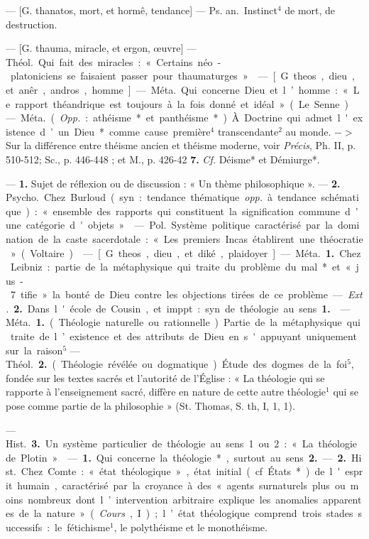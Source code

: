 \begin{itemize}[leftmargin=1cm, label=, itemsep=1pt]
 — [G. thanatos, mort, et
hormê, tendance] — \si{Ps. an.} Instinct$^4$
de mort, de destruction.

 — [G. thauma, miracle, et
ergon, œuvre] — \si{Théol.} Qui fait
des miracles : « Certains néo-platoniciens se faisaient passer pour
thaumaturges. »

 — [G. theos, dieu, et anêr,
andros, homme] — \si{Méta.} Qui concerne Dieu et l’homme : « Le rapport
théandrique est toujours à la fois
donné et idéal » (Le Senne).

 — \si{Méta.} ({\it Opp.} : athéisme* et
panthéisme*). À. Doctrine qui admet
l'existence d’un Dieu* comme cause
première$^4$ transcendante$^2$ au monde.
$->$ Sur la différence entre théisme
ancien et théisme moderne, voir
{\it Précis}, Ph. II, p. 510-512; Sc.,
p. 446-448 ; et M., p. 426-42 {\bf 7.} {\it Cf.}
Déisme* et Démiurge*.

 — {\bf 1.} Sujet de réflexion ou de
discussion : « Un thème philosophique ». — {\bf 2.} \si{Psycho.} Chez Burloud (syn. : tendance thématique {\it opp.}
à tendance schématique) : « ensemble
des rapports qui constituent la signification commune d’une catégorie d'objets. »

 — \si{Pol.} Système politique
caractérisé par la domination de la
caste sacerdotale : « Les premiers
Incas établirent une théocratie »
(Voltaire).

 — [G. theos, dieu, et diké, plaidoyer] — \si{Méta.} {\bf 1.} Chez Leibniz :
partie de la métaphysique qui
traite du problème du mal* et « jus- 7
tifie » la bonté de Dieu contre les
objections tirées de ce problème. —
{\it Ext.} {\bf 2.} Dans l'école de Cousin, et
imppt : syn. de théologie au sens {\bf 1.}

 — \si{Méta.} {\bf 1.} (Théologie naturelle ou rationnelle). Partie de la
métaphysique qui traite de l’existence et des attributs de Dieu en
s'appuyant uniquement sur la
raison$^5$ — \si{Théol.} {\bf 2.} (Théologie révélée ou dogmatique). Étude des
dogmes de la foi$^5$, fondée sur les
textes sacrés et l'autorité de l’Église :
« La théologie qui se rapporte à
l’enseignement sacré, diffère en nature de cette autre théologie$^1$ qui
se pose comme partie de la philosophie » (St. Thomas, S. th, I, 1, 1).

— \si{Hist.} {\bf 3.} Un système particulier de théologie au sens 1 ou 2 : « La
théologie de Plotin. »

 — {\bf 1.} Qui concerne la
théologie*, surtout au sens {\bf 2.} —
 {\bf 2.} \si{Hist.} Chez Comte : « état théologique », état initial (cf. États*) de
l'esprit humain, caractérisé par la
croyance à des « agents surnaturels
plus ou moins nombreux dont l’intervention arbitraire explique les
anomalies apparentes de la nature »
({\it Cours}, I) ; l’état théologique comprend trois stades successifs : le
fétichisme$^1$, le polythéisme et le monothéisme.


\end{itemize}
